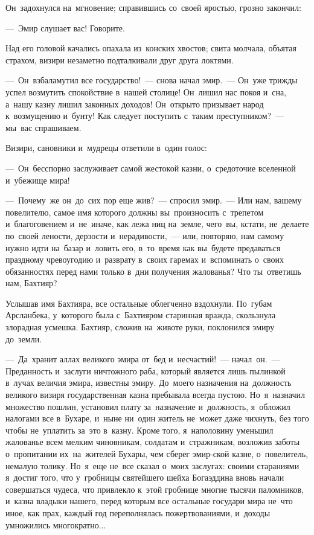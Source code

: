 \documentclass[12pt,a4paper]{book}
\begin{document}
Он~задохнулся на~мгновение; справившись со~своей яростью, грозно закончил:

—~Эмир слушает вас! Говорите.

Над его головой качались опахала из~конских хвостов; свита молчала, объятая страхом, визири незаметно подталкивали друг друга локтями.

—~Он~взбаламутил все государство!~— снова начал эмир.~— Он~уже трижды успел возмутить спокойствие в~нашей столице! Он~лишил нас покоя и~сна, а~нашу казну лишил законных доходов! Он~открыто призывает народ к~возмущению и~бунту! Как следует поступить с~таким преступником?~— мы~вас спрашиваем.

Визири, сановники и~мудрецы ответили в~один голос:

—~Он~бесспорно заслуживает самой жестокой казни, о~средоточие вселенной и~убежище мира!

—~Почему~же он~до~сих пор еще жив?~— спросил эмир.~— Или нам, вашему повелителю, самое имя которого должны вы~произносить с~трепетом и~благоговением и~не~иначе, как лежа ниц на~земле, чего~вы, кстати, не~делаете по~своей лености, дерзости и~нерадивости,~— или, повторяю, нам самому нужно идти на~базар и~ловить его, в~то~время как вы~будете предаваться праздному чревоугодию и~разврату в~своих гаремах и~вспоминать о~своих обязанностях перед нами только в~дни получения жалованья? Что ты~ответишь нам, Бахтияр?

Услышав имя Бахтияра, все остальные облегченно вздохнули. По~губам Арсланбека, у~которого была с~Бахтияром старинная вражда, скользнула злорадная усмешка. Бахтияр, сложив на~животе руки, поклонился эмиру до~земли.

—~Да~хранит аллах великого эмира от~бед и~несчастий!~— начал~он.~— Преданность и~заслуги ничтожного раба, который является лишь пылинкой в~лучах величия эмира, известны эмиру. До~моего назначения на~должность великого визиря государственная казна пребывала всегда пустою. Но~я~назначил множество пошлин, установил плату за~назначение и~должность, я~обложил налогами все в~Бухаре, и~ныне ни~один житель не~может даже чихнуть, без того чтобы не~уплатить за~это в~казну. Кроме того, я~наполовину уменьшил жалованье всем мелким чиновникам, солдатам и~стражникам, возложив заботы о~пропитании их~на~жителей Бухары, чем сберег эмир-ской казне, о~повелитель, немалую толику. Но~я~еще не~все сказал о~моих заслугах: своими стараниями я~достиг того, что у~гробницы святейшего шейха Богаэддина вновь начали совершаться чудеса, что привлекло к~этой гробнице многие тысячи паломников, и~казна владыки нашего, перед которым все остальные государи мира не~что иное, как прах, каждый год переполнялась пожертвованиями, и~доходы умножились многократно...
\end{document}
